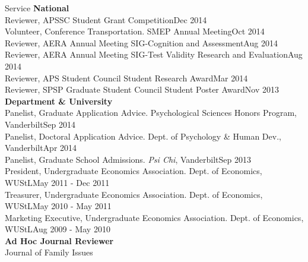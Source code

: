 \documentclass {resume}
\begin{document}
\begin{rSection}{\textrm{Service}}
{\large \textbf{National}}\\
Reviewer, APSSC Student Grant Competition\hfill{Dec 2014}\smallskip\\
Volunteer, Conference Transportation. SMEP Annual Meeting\hfill{Oct 2014}\smallskip\\
Reviewer, AERA Annual Meeting SIG-Cognition and Assessment\hfill{Aug 2014}\smallskip\\%
Reviewer, AERA Annual Meeting SIG-Test Validity Research and Evaluation\hfill{Aug 2014}\smallskip\\
Reviewer, APS Student Council Student Research Award\hfill{Mar 2014}\smallskip\\
Reviewer, SPSP Graduate Student Council Student Poster Award\hfill{Nov 2013}\medskip\\
{\large \textbf{Department \& University}}\\
Panelist, Graduate Application Advice. Psychological Sciences Honors Program, Vanderbilt\hfill {Sep 2014}\smallskip\\
Panelist, Doctoral Application Advice. Dept. of Psychology \& Human Dev., Vanderbilt\hfill {Apr 2014}\smallskip\\
Panelist, Graduate School Admissions. \textit{Psi Chi}, Vanderbilt\hfill {Sep 2013}\smallskip\\
President, Undergraduate Economics Association. Dept. of Economics, WUStL\hfill  {May 2011 - Dec 2011}\smallskip\\
Treasurer, Undergraduate Economics Association. Dept. of Economics, WUStL\hfill{May 2010 - May 2011}\smallskip\\
Marketing Executive, Undergraduate Economics Association. Dept. of Economics, WUStL\hfill  {Aug 2009 - May 2010}\medskip\\
{\large \textbf{Ad Hoc Journal Reviewer}}\\
Journal of Family Issues%
\end{rSection}
\end{document}
